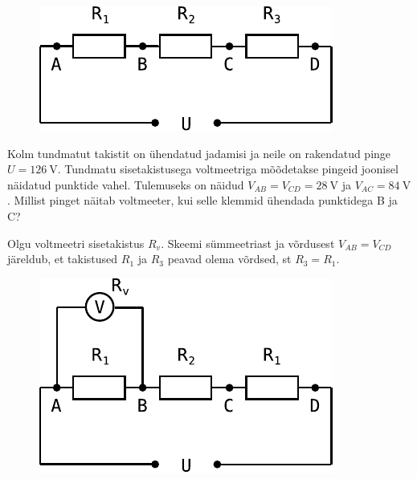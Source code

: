 
\begin{figure}
  \begin{center}
    \includegraphics[width=1\linewidth]{2023-v2g-07-yl.pdf}
  \end{center}
  \vspace{-2em}
\end{figure}

Kolm tundmatut takistit on ühendatud jadamisi ja neile on rakendatud pinge $U=\SI{126}{\volt}$. Tundmatu sisetakistusega voltmeetriga mõõdetakse pingeid joonisel näidatud punktide vahel. Tulemuseks on näidud $V_{AB}=V_{CD}=\SI{28}{\volt}$ ja $V_{AC}=\SI{84}{\volt}$. Millist pinget näitab voltmeeter, kui selle klemmid ühendada punktidega B ja C?




\hint

\solu
Olgu voltmeetri sisetakistus $R_v$. Skeemi sümmeetriast ja võrdusest $V_{AB}=V_{CD}$ järeldub, et takistused $R_1$ ja $R_3$ peavad olema võrdsed, st $R_3=R_1$. 

\begin{figure}
\vspace{-1em}
  \begin{center}
    \includegraphics[width=1\linewidth]{2023-v2g-07-sol1.pdf}
  \end{center}
\end{figure}

